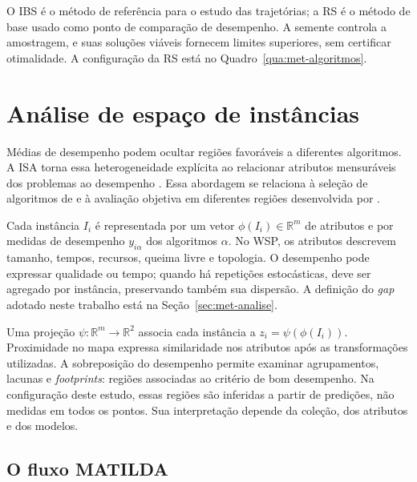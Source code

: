 O IBS é o método de referência para o estudo das trajetórias; a RS é o
método de base usado como ponto de comparação de desempenho. A semente
controla a amostragem, e suas soluções viáveis fornecem limites superiores,
sem certificar otimalidade. A configuração da RS está no
Quadro~\ref{qua:met-algoritmos}.

\section{Análise de espaço de instâncias}\label{sec:isa}

Médias de desempenho podem ocultar regiões favoráveis a diferentes
algoritmos. A ISA torna essa heterogeneidade explícita ao
relacionar atributos mensuráveis dos problemas ao desempenho
\cite{MunozEtAl2018,SmithMilesMunoz2023}. Essa abordagem se relaciona
à seleção de algoritmos de  e à avaliação objetiva
em diferentes regiões desenvolvida por .

Cada instância $I_i$ é representada por um vetor
$\phi(I_i)\in\mathbb{R}^m$ de atributos e por medidas de desempenho
$y_{i\alpha}$ dos algoritmos $\alpha$. No WSP, os atributos descrevem
tamanho, tempos, recursos, queima livre e topologia. O desempenho pode
expressar qualidade ou tempo; quando há repetições estocásticas, deve ser
agregado por instância, preservando também sua dispersão. A definição do
\textit{gap} adotado neste trabalho está na Seção~\ref{sec:met-analise}.

Uma projeção $\psi:\mathbb{R}^m\rightarrow\mathbb{R}^2$ associa cada
instância a $z_i=\psi(\phi(I_i))$. Proximidade no mapa expressa similaridade
nos atributos após as transformações utilizadas. A sobreposição do desempenho permite
examinar agrupamentos, lacunas e \textit{footprints}: regiões associadas
ao critério de bom desempenho. Na configuração deste estudo, essas
regiões são inferidas a partir de predições, não medidas em todos os pontos.
Sua interpretação depende da coleção, dos atributos e dos modelos.

\subsection{O fluxo MATILDA}\label{sec:matilda}

